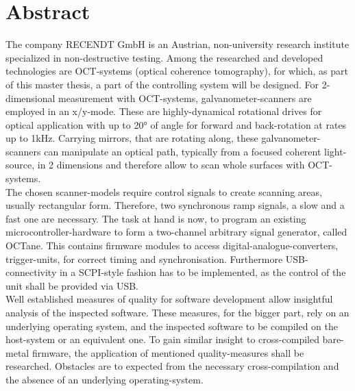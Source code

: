 \chapter{Abstract}

The company RECENDT GmbH is an Austrian, non-university research institute specialized in non-destructive testing. Among the researched and developed technologies are OCT-systems (optical coherence tomography), for which, as part of this master thesis, a part of the controlling system will be designed. For 2-dimensional measurement with OCT-systems, galvanometer-scanners are employed in an x/y-mode. These are highly-dynamical rotational drives for optical application with up to 20° of angle for forward and back-rotation at rates up to 1kHz. Carrying mirrors, that are rotating along, these galvanometer-scanners can manipulate an optical path, typically from a focused coherent light-source, in 2 dimensions and therefore allow to scan whole surfaces with OCT-systems. \\

The chosen scanner-models require control signals to create scanning areas, usually rectangular form. Therefore, two synchronous ramp signals, a slow and a fast one are necessary. The task at hand is now, to program an existing microcontroller-hardware to form a two-channel arbitrary signal generator, called OCTane. This contains firmware modules to access digital-analogue-converters, trigger-units, for correct timing and synchronisation. Furthermore USB-connectivity in a SCPI-style fashion has to be implemented, as the control of the unit shall be provided via USB. \\

Well established measures of quality for software development allow insightful analysis of the inspected software. These measures, for the bigger part, rely on an underlying operating system, and the inspected software to be compiled on the host-system or an equivalent one. To gain similar insight to cross-compiled bare-metal firmware, the application of mentioned quality-measures shall be researched. Obstacles are to expected from the necessary cross-compilation and the absence of an underlying operating-system.

